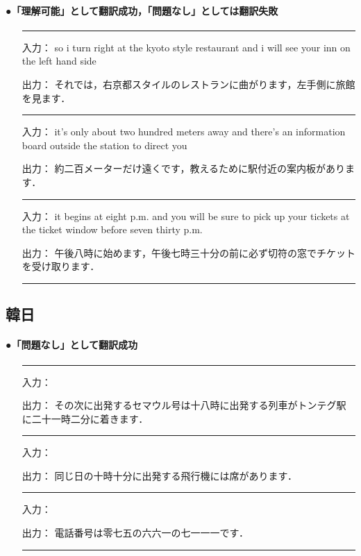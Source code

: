 \vspace{5mm}
\paragraph{●「理解可能」として翻訳成功，「問題なし」としては翻訳失敗}

\begin{itemize}
\item[]\rule{132mm}{0.2mm}
\item[入力：]so i turn right at the kyoto style restaurant and i will see your inn on the left hand side 
\item[出力：]それでは，右京都スタイルのレストランに曲がります，左手側に旅館を見ます． 
\item[]\rule{132mm}{0.2mm}
\item[入力：]it's only about two hundred meters away and there's an information board outside the station to direct you    
\item[出力：]約二百メーターだけ遠くです，教えるために駅付近の案内板があります． 
\item[]\rule{132mm}{0.2mm}
\item[入力：]it begins at eight p.m. and you will be sure to pick up your tickets at the ticket window before seven thirty p.m.   
\item[出力：]午後八時に始めます，午後七時三十分の前に必ず切符の窓でチケットを受け取ります． 
\item[]\rule{132mm}{0.2mm}
\end{itemize}

 
\newpage
\subsection{韓日}
\paragraph{●「問題なし」として翻訳成功}

\begin{itemize}
\item[]\rule{132mm}{0.2mm}
\item[入力：]
\vspace*{2mm}
\item[出力：]その次に出発するセマウル号は十八時に出発する列車がトンテグ駅に二十一時二分に着きます．
\item[]\rule{132mm}{0.2mm}
\item[入力：]
\vspace*{2mm}
\item[出力：]同じ日の十時十分に出発する飛行機には席があります．
\item[]\rule{132mm}{0.2mm}
\item[入力：]
\item[出力：]電話番号は零七五の六六一の七一一一です．
\item[]\rule{132mm}{0.2mm}
\end{itemize}



